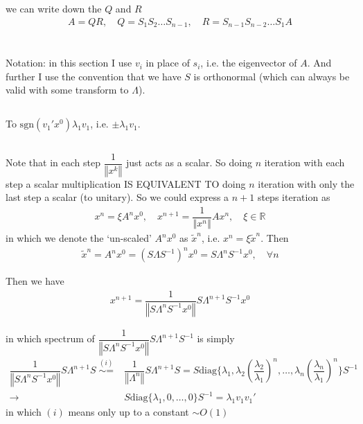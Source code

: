 \documentclass[11pt,a4paper]{ctexart}
\numberwithin{equation}{section}%
\begin{document}
we can write down the $ Q $ and $ R $
\begin{align*}
    A=QR,\quad Q=S_1S_2\ldots S_{n-1},\quad R=S_{n-1}S_{n-2}\ldots S_1  A
\end{align*}

\section{}
Notation: in this section I use $ v_i $ in place of $ s_i $, i.e. the eigenvector of $ A $. And further I use the convention that we have $ S $ is orthonormal (which can always be valid with some transform to $ \Lambda  $).
\subsection{}
To $ \mathrm{sgn}(v_1'x^0)\lambda _1v_1 $, i.e. $ \pm\lambda _1v_1 $.
\subsection{}
Note that in each step $ \dfrac{ 1 }{ \left\Vert x^k \right\Vert  }  $ just acts as a scalar. So doing $ n $ iteration with each step a scalar multiplication IS EQUIVALENT TO doing $ n $ iteration with only the last step a scalar (to unitary). So we could express a $ n+1 $ steps iteration as
\begin{align*}
    x^{n} = \xi A^{n}x^0 ,\quad x^{n+1}=\dfrac{ 1 }{ \left\Vert x^n \right\Vert  }Ax^n ,\quad \xi \in\mathbb{R}
\end{align*}
in which we denote the `un-scaled' $ A^nx^0 $ as $ \tilde{x}^n $, i.e. $ x^n=\xi \tilde{x}^n $. Then
\begin{align*}
    \tilde{x}^n= A^nx^0=(S\Lambda S^{-1})^nx^0 = S\Lambda^nS^{-1}x^0,\quad \forall n
\end{align*}

Then we have
\begin{align*}
    x^{n+1} = \dfrac{ 1 }{ \left\Vert S\Lambda ^{n}S^{-1} x^0 \right\Vert  } S\Lambda ^{n+1}S^{-1} x^0 
\end{align*}


in which spectrum of $ \dfrac{ 1 }{ \left\Vert S\Lambda ^{n}S^{-1} x^0 \right\Vert  } S\Lambda ^{n+1}S^{-1} $ is simply
\begin{align*}
    \dfrac{ 1  }{ \left\Vert S\Lambda ^{n}S^{-1} x^0 \right\Vert  } S\Lambda ^{n+1}S\mathop{ \sim = }\limits^{(i)} &\dfrac{ 1 }{ \left\Vert \Lambda ^{n}  \right\Vert  } S\Lambda ^{n+1}S =  S\mathrm{diag}\{\lambda _1, \lambda _2\left(\dfrac{ \lambda _2 }{ \lambda _1 }\right)^n,\ldots , \lambda _n\left(\dfrac{ \lambda _n }{ \lambda _1 }\right)^n \}S^{-1}\\
    \to & S\mathrm{diag}\{\lambda _1, 0,\ldots, 0\}S^{-1}=\lambda _1v_1v_1'
\end{align*}
in which $ (i) $ means only up to a constant $ \sim O(1) $
\end{document}
